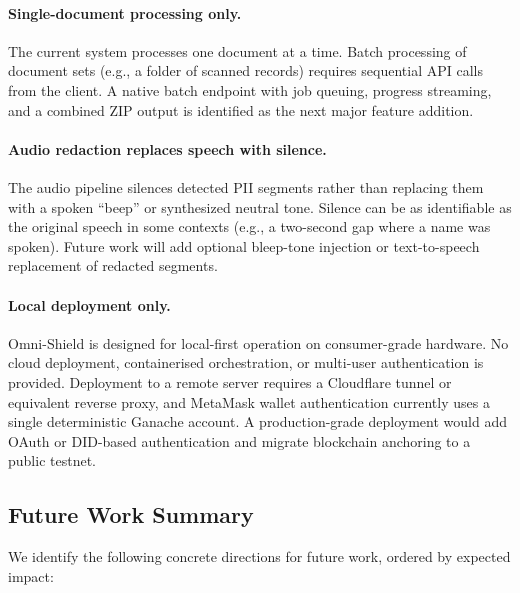 \paragraph{Single-document processing only.}
The current system processes one document at a time.
Batch processing of document sets (e.g., a folder of
scanned records) requires sequential API calls from
the client.
A native batch endpoint with job queuing, progress
streaming, and a combined ZIP output is identified as
the next major feature addition.
 
\paragraph{Audio redaction replaces speech with silence.}
The audio pipeline silences detected PII segments
rather than replacing them with a spoken ``beep''
or synthesized neutral tone.
Silence can be as identifiable as the original
speech in some contexts (e.g., a two-second gap
where a name was spoken).
Future work will add optional bleep-tone injection
or text-to-speech replacement of redacted segments.
 
\paragraph{Local deployment only.}
Omni-Shield is designed for local-first operation
on consumer-grade hardware.
No cloud deployment, containerised orchestration,
or multi-user authentication is provided.
Deployment to a remote server requires a Cloudflare
tunnel or equivalent reverse proxy, and MetaMask wallet
authentication currently uses a single deterministic
Ganache account.
A production-grade deployment would add OAuth or
DID-based authentication and migrate blockchain
anchoring to a public testnet.
 
\subsection{Future Work Summary}
 
We identify the following concrete directions for
future work, ordered by expected impact:
 

